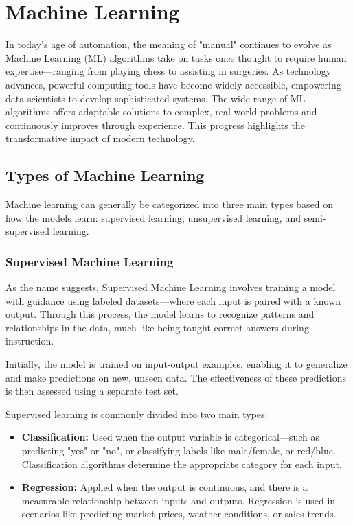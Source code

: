 \section{Machine Learning}
In today’s age of automation, the meaning of "manual" continues to evolve as Machine Learning (ML) algorithms take on tasks once thought to require human expertise—ranging from playing chess to assisting in surgeries. As technology advances, powerful computing tools have become widely accessible, empowering data scientists to develop sophisticated systems. The wide range of ML algorithms offers adaptable solutions to complex, real-world problems and continuously improves through experience. This progress highlights the transformative impact of modern technology.

\subsection{Types of Machine Learning}
Machine learning can generally be categorized into three main types based on how the models learn: supervised learning, unsupervised learning, and semi-supervised learning.

\subsubsection*{Supervised Machine Learning}
As the name suggests, Supervised Machine Learning involves training a model with guidance using labeled datasets—where each input is paired with a known output. Through this process, the model learns to recognize patterns and relationships in the data, much like being taught correct answers during instruction.

Initially, the model is trained on input-output examples, enabling it to generalize and make predictions on new, unseen data. The effectiveness of these predictions is then assessed using a separate test set.

Supervised learning is commonly divided into two main types:

\begin{itemize}
  \item \textbf{Classification:} Used when the output variable is categorical—such as predicting "yes" or "no", or classifying labels like male/female, or red/blue. Classification algorithms determine the appropriate category for each input.
  
  \item \textbf{Regression:} Applied when the output is continuous, and there is a measurable relationship between inputs and outputs. Regression is used in scenarios like predicting market prices, weather conditions, or sales trends.
\end{itemize}

